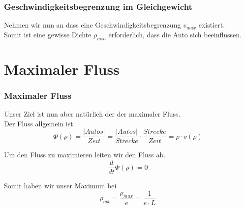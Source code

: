 \documentclass{beamer}
\begin{document}
\begin{frame}
\frametitle{Geschwindigkeitsbegrenzung im Gleichgewicht}

Nehmen wir nun an dass eine Geschwindigkeitsbegrenzung $v_{max}$ existiert.\\
Somit ist eine gewisse Dichte $\rho_{min}$ erforderlich, dass die Auto sich beeinflussen.
\end{frame}


\section{Maximaler Fluss}


\begin{frame}
\frametitle{Maximaler Fluss}
Unser Ziel ist nun aber natürlich der der maximaler Fluss.\\
Der Fluss allgemein ist 
$$\Phi(\rho)
=\frac{|Autos|}{Zeit}
=\frac{|Autos|}{Strecke} \cdot \frac{Strecke}{Zeit}
=\rho \cdot v(\rho)$$

Um den Fluss zu maximieren leiten wir den Fluss ab.
$$\frac{d}{dt}\Phi(\rho)=0$$

Somit haben wir unser Maximum bei
$$\rho_{opt}=\frac{\rho_{max}}{e}=\frac{1}{e\cdot L}$$

\end{frame}


\end{document}

